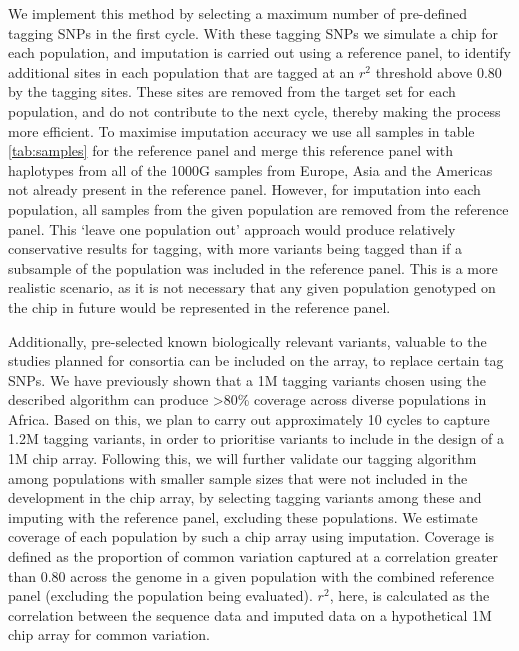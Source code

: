 

We implement this method by selecting a maximum number of pre-defined tagging SNPs in the first cycle. With these tagging SNPs we simulate a chip for each population, and imputation is carried out using a reference panel, to identify additional sites in each population that are tagged at an $r^{2}$ threshold above 0.80 by the tagging sites. These sites are removed from the target set for each population, and do not contribute to the next cycle, thereby making the process more efficient. To maximise imputation accuracy we use all samples in table \ref{tab:samples} for the reference panel and merge this reference panel with haplotypes from all of the 1000G samples from Europe, Asia and the Americas not already present in the reference panel. However, for imputation into each population, all samples from the given population are removed from the reference panel. This ‘leave one population out’ approach would produce relatively conservative results for tagging, with more variants being tagged than if a subsample of the population was included in the reference panel. This is a more realistic scenario, as it is not necessary that any given population genotyped on the chip in future would be represented in the reference panel.

Additionally, pre-selected known biologically relevant variants, valuable to the studies planned for consortia can be included on the array, to replace certain tag SNPs. We have previously shown that a 1M tagging variants chosen using the described algorithm can produce \textgreater80\% coverage across diverse populations in Africa. Based on this, we plan to carry out approximately 10 cycles to capture 1.2M tagging variants, in order to prioritise variants to include in the design of a 1M chip array. Following this, we will further validate our tagging algorithm among populations with smaller sample sizes that were not included in the development in the chip array, by selecting tagging variants among these and imputing with the reference panel, excluding these populations. We estimate coverage of each population by such a chip array using imputation. Coverage is defined as the proportion of common variation captured at a correlation greater than 0.80 across the genome in a given population with the combined reference panel (excluding the population being evaluated). $r^{2}$, here, is calculated as the correlation between the sequence data and imputed data on a hypothetical 1M chip array for common variation. 

